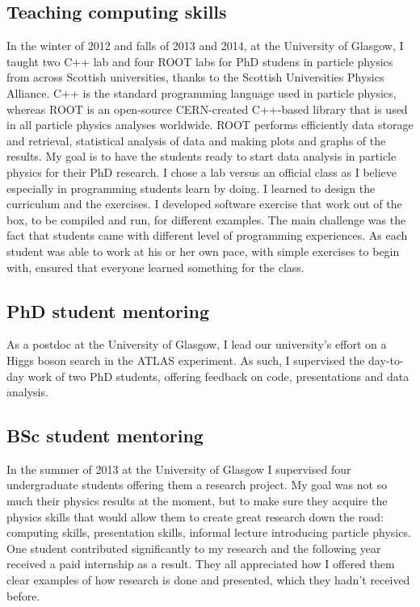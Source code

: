 \documentclass[12pt]{article} %
\begin{document}
\subsection{Teaching computing skills}

In the winter of 2012 and falls of 2013 and 2014, at the University of Glasgow, I taught two C++ lab and four ROOT labs for PhD studens in particle physics from across Scottish universities, thanks to the Scottish Universities Physics Alliance. C++ is the standard programming language used in particle physics, whereas ROOT is an open-source CERN-created C++-based library that is used in all particle physics analyses worldwide. ROOT performs efficiently data storage and retrieval, statistical analysis of data and making plots and graphs of the results. My goal is to have the students ready to start data analysis in particle physics for their PhD research. I chose a lab versus an official class as I believe especially in programming students learn by doing. I learned to design the curriculum and the exercises. I developed software exercise that work out of the box, to be compiled and run, for different examples. The main challenge was the fact that students came with different level of programming experiences. As each student was able to work at his or her own pace, with simple exercises to begin with, ensured that everyone learned something for the class. 

\subsection{PhD student mentoring}

As a postdoc at the University of Glasgow, I lead our university's effort on a Higgs boson search in the ATLAS experiment. As such, I supervised the day-to-day work of two PhD students, offering feedback on code, presentations and data analysis.  

\subsection{BSc student mentoring}

In the summer of 2013 at the University of Glasgow I supervised four undergraduate students offering them a research project. My goal was not so much their physics results at the moment, but to make sure they acquire the physics skills that would allow them to create great research down the road: computing skills, presentation skills, informal lecture introducing particle physics. One student contributed significantly to my research and the following year received a paid internship as a result. They all appreciated how I offered them clear examples of how research is done and presented, which they hadn't received before.
\end{document}
